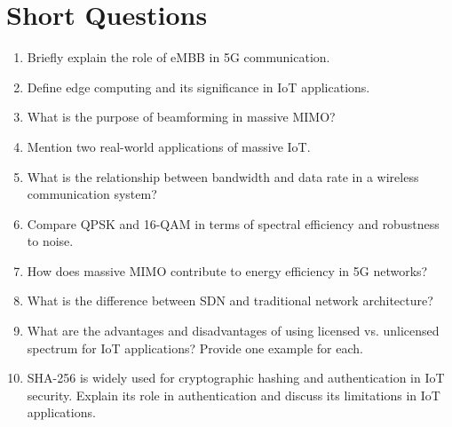 \documentclass[12pt]{article}
\begin{document}
\section{Short Questions}
\begin{enumerate}
    \item Briefly explain the role of eMBB in 5G communication.
    \item Define edge computing and its significance in IoT applications.
    \item What is the purpose of beamforming in massive MIMO?
    \item Mention two real-world applications of massive IoT.
    \item What is the relationship between bandwidth and data rate in a wireless communication system?
    \item Compare QPSK and 16-QAM in terms of spectral efficiency and robustness to noise. 
    \item How does massive MIMO contribute to energy efficiency in 5G networks?
    \item What is the difference between SDN and traditional network architecture?
    \item What are the advantages and disadvantages of using licensed vs. unlicensed spectrum for IoT applications? Provide one example for each.
    \item SHA-256 is widely used for cryptographic hashing and authentication in IoT security. Explain its role in authentication and discuss its limitations in IoT applications.
\end{enumerate} 
\newpage
\end{document}
